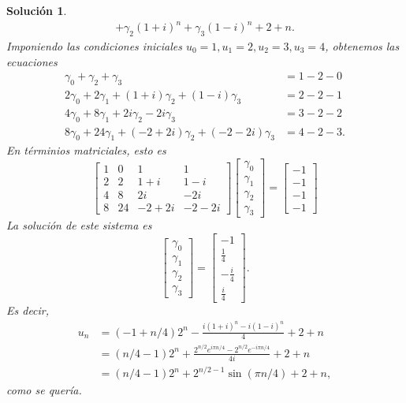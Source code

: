 \documentclass[11pt]{article}
\newtheorem*{sol}{Solución}
\begin{document}
\begin{sol}
\begin{align}
    + \gamma_2(1+i)^{n}
    + \gamma_3(1-i)^{n}
    + 2
    + n
  .\end{align}
  Imponiendo las condiciones iniciales $u_0=1, u_1=2, u_2=3, u_3=4$,
  obtenemos las ecuaciones
  \begin{align}
    \gamma_0
    + \gamma_2
    + \gamma_3
    &= 1 - 2 - 0
    \\
    2\gamma_0 + 2\gamma_1
    +
    (1+i)
    \gamma_2
    +
    (1-i)
    \gamma_3
    &= 2 - 2 - 1
    \\
    4\gamma_0 + 8\gamma_1
    + 2i \gamma_2
    - 2i\gamma_3
    &= 3 - 2 - 2
    \\
    8\gamma_0 + 24\gamma_1
    + (-2+2i)\gamma_2
    + (-2-2i)\gamma_3
    &= 4 - 2 - 3
  .\end{align}
  En términios matriciales, esto es
  \begin{equation}
    \begin{bmatrix}
      1 & 0 & 1 & 1 \\
      2 & 2 & 1+i & 1-i \\
      4 & 8 & 2i & -2i \\
      8 & 24 & -2+2i & -2-2i
    \end{bmatrix}
    \begin{bmatrix}
      \gamma_0 \\
      \gamma_1 \\
      \gamma_2 \\
      \gamma_3
    \end{bmatrix}
    =
    \begin{bmatrix}
      -1 \\
      -1 \\
      -1 \\
      -1
    \end{bmatrix}
  \end{equation}
  La solución de este sistema es
  \begin{equation}
    \begin{bmatrix}
      \gamma_0 \\
      \gamma_1 \\
      \gamma_2 \\
      \gamma_3
    \end{bmatrix}
    =
    \begin{bmatrix}
      -1 \\
      \frac{1}{4} \\
      -\frac{i}{4} \\
      \frac{i}{4}
    \end{bmatrix}
  .\end{equation}
  Es decir,
  \begin{align}
    u_n
    &= (-1 + n / 4) 2^{n}
    - \frac{i(1+i)^{n} - i(1-i)^{n}}{4}
    + 2 + n
    \\
    &= (n / 4 - 1) 2^{n}
    + \frac{2^{n / 2}e^{i\pi n / 4} - 2^{n / 2} e^{-i\pi n / 4}}{4i}
    + 2 + n
    \\
    &= (n / 4 - 1) 2^{n}
    + 2^{n / 2 - 1} \sin(\pi n / 4)
    + 2 + n
  ,\end{align}
  como se quería.
\end{sol}
\end{document}

